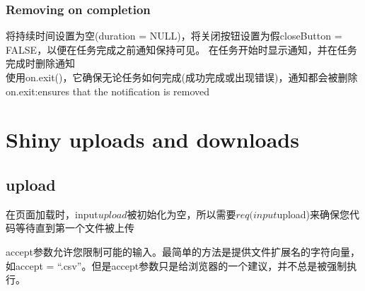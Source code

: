 \documentclass[
]{book}
\newenvironment{Shaded}{\begin{snugshade}}{\end{snugshade}}
\newcommand{\AttributeTok}[1]{\textcolor[rgb]{0.77,0.63,0.00}{#1}}
\newcommand{\ConstantTok}[1]{\textcolor[rgb]{0.00,0.00,0.00}{#1}}
\newcommand{\ControlFlowTok}[1]{\textcolor[rgb]{0.13,0.29,0.53}{\textbf{#1}}}
\newcommand{\FunctionTok}[1]{\textcolor[rgb]{0.00,0.00,0.00}{#1}}
\newcommand{\NormalTok}[1]{#1}
\newcommand{\OtherTok}[1]{\textcolor[rgb]{0.56,0.35,0.01}{#1}}
\newcommand{\SpecialCharTok}[1]{\textcolor[rgb]{0.00,0.00,0.00}{#1}}
\newcommand{\StringTok}[1]{\textcolor[rgb]{0.31,0.60,0.02}{#1}}
\begin{document}
\hypertarget{removing-on-completion}{%
\subsection{Removing on completion}\label{removing-on-completion}}

将持续时间设置为空(duration = NULL)，将关闭按钮设置为假closeButton = FALSE，以便在任务完成之前通知保持可见。
在任务开始时显示通知，并在任务完成时删除通知\\
使用on.exit()，它确保无论任务如何完成(成功完成或出现错误)，通知都会被删除\\
on.exit:ensures that the notification is removed

\hypertarget{shiny-uploads-and-downloads}{%
\chapter{Shiny uploads and downloads}\label{shiny-uploads-and-downloads}}

\hypertarget{upload}{%
\section{upload}\label{upload}}

\begin{Shaded}
\end{Shaded}

在页面加载时，input\(upload被初始化为空，所以需要req(input\)upload)来确保您代码等待直到第一个文件被上传

accept参数允许您限制可能的输入。最简单的方法是提供文件扩展名的字符向量，如accept = ``.csv''。但是accept参数只是给浏览器的一个建议，并不总是被强制执行。
\end{document}
